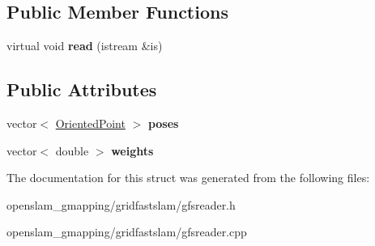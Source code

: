 \subsection*{Public Member Functions}
\begin{DoxyCompactItemize}
\item 
\mbox{\label{structGMapping_1_1GFSReader_1_1ScanMatchRecord_a79413e9faad52d25db68528a8b948cf7}} 
virtual void {\bfseries read} (istream \&is)
\end{DoxyCompactItemize}
\subsection*{Public Attributes}
\begin{DoxyCompactItemize}
\item 
\mbox{\label{structGMapping_1_1GFSReader_1_1ScanMatchRecord_a6fac87e602cb453346440441997e7c9e}} 
vector$<$ \hyperlink{structGMapping_1_1orientedpoint}{Oriented\+Point} $>$ {\bfseries poses}
\item 
\mbox{\label{structGMapping_1_1GFSReader_1_1ScanMatchRecord_a7e3668ff996a2e0032e161cd68706c79}} 
vector$<$ double $>$ {\bfseries weights}
\end{DoxyCompactItemize}


The documentation for this struct was generated from the following files\+:\begin{DoxyCompactItemize}
\item 
openslam\+\_\+gmapping/gridfastslam/gfsreader.\+h\item 
openslam\+\_\+gmapping/gridfastslam/gfsreader.\+cpp\end{DoxyCompactItemize}
